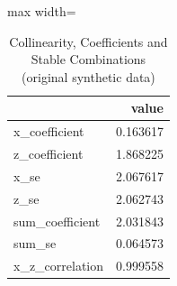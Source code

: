 \begin{table}[htbp]
\centering
\caption{Collinearity, Coefficients and Stable Combinations (original synthetic data)}
\begingroup
\small
\setlength{\tabcolsep}{6pt}
\renewcommand{\arraystretch}{1.12}
\begin{adjustbox}{max width=\linewidth}
\begin{tabular}{@{}lr@{}}
\toprule
 & value \\
\midrule
x\_coefficient & 0.163617 \\
z\_coefficient & 1.868225 \\
x\_se & 2.067617 \\
z\_se & 2.062743 \\
sum\_coefficient & 2.031843 \\
sum\_se & 0.064573 \\
x\_z\_correlation & 0.999558 \\
\bottomrule
\end{tabular}
\end{adjustbox}
\endgroup
\end{table}